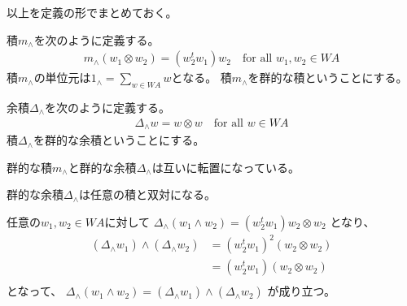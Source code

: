 	以上を定義の形でまとめておく。

	\begin{definition}[群的な積]\label{def:群的な積} %
		積$m_\land$を次のように定義する。
		\begin{equation*}\begin{split} %
			m_\land(w_1\otimes w_2) = (w_2^tw_1)w_2
			\quad\text{for all }w_1,w_2\in WA
		\end{split}\end{equation*} %
		積$m_\land$の単位元は$1_\land=\sum_{w\in WA}w$となる。
		積$m_\land$を群的な積ということにする。
	\end{definition} %

	\begin{definition}[群的な余積]\label{def:群的な余積} %
		余積$\Delta_\land$を次のように定義する。
		\begin{equation*}\begin{split} %
			\Delta_\land w = w\otimes w \quad\text{for all }w\in WA
		\end{split}\end{equation*} %
		積$\Delta_\land$を群的な余積ということにする。
	\end{definition} %

	\begin{proposition}[群的な余積の転置]\label{prop:群的な余積の転置} %
		群的な積$m_\land$と群的な余積$\Delta_\land$は互いに転置になっている。
	\end{proposition} %

	\begin{proposition}[群的な余積の汎用性]\label{prop:群的な余積の汎用性} %
		群的な余積$\Delta_\land$は任意の積と双対になる。
	\end{proposition} %

	\begin{note}[群的な余積の自己双対性]\label{note:群的な余積の自己双対性} %
		任意の$w_1,w_2\in WA$に対して
		$\Delta_\land(w_1\land w_2)=(w_2^tw_1)w_2\otimes w_2$
		となり、$		$
		\begin{equation*}\begin{split} %
			(\Delta_\land w_1)\land(\Delta_\land w_2)
			&=(w_2^tw_1)^2(w_2\otimes w_2) \\
			&=(w_2^tw_1)(w_2\otimes w_2) \\
		\end{split}\end{equation*} %
		となって、
		$\Delta_\land(w_1\land w_2)=(\Delta_\land w_1)\land(\Delta_\land w_2)$
		が成り立つ。
	\end{note} %

